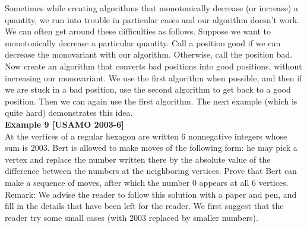 \documentclass[a4paper,11pt]{book}
\begin{document}
Sometimes while creating algorithms that monotonically decrease
(or increase) a quantity, we run into trouble in particular cases
and our algorithm doesn’t work. We can often get around these
difficulties as follows. Suppose we want to monotonically
decrease a particular quantity. Call a position good if we can
decrease the monovariant with our algorithm. Otherwise, call the
position bad. Now create an algorithm that converts bad positions
into good positions, without increasing our monovariant. We use
the first algorithm when possible, and then if we are stuck in a bad
position, use the second algorithm to get back to a good position.
Then we can again use the first algorithm. The next example
(which is quite hard) demonstrates this idea.\\

\textbf{ Example 9 [USAMO 2003-6]}\\
At the vertices of a regular hexagon are written 6 nonnegative
integers whose sum is 2003. Bert is allowed to make moves of the
following form: he may pick a vertex and replace the number
written there by the absolute value of the difference between the
numbers at the neighboring vertices. Prove that Bert can make a
sequence of moves, after which the number 0 appears at all 6
vertices.
Remark: We advise the reader to follow this solution with a paper
and pen, and fill in the details that have been left for the reader.
We first suggest that the reader try some small cases (with 2003
replaced by smaller numbers).\\
\end{document}
